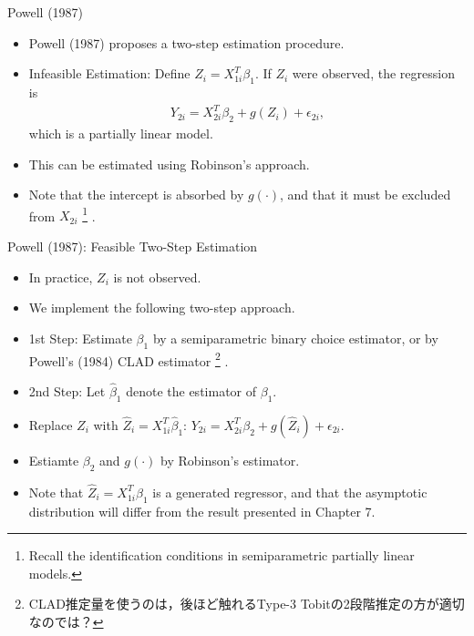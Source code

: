 \documentclass[xcolor=svgnames,dvipdfmx,cjk]{beamer}
\theoremstyle{example}
\begin{document}
\begin{frame}{Powell (1987)}
      \begin{itemize}
            \item Powell (1987) proposes a two-step estimation procedure.
            \item \alert{Infeasible Estimation}: Define $Z_i = X_{1i}^T \beta_1$. If $Z_i$ were observed, the regression is 
                  \begin{align*}
                        Y_{2i} = X_{2i}^T \beta_2 + g(Z_i) + \epsilon_{2i},
                  \end{align*}
                  which is a partially linear model. 
            \item This can be estimated using Robinson's approach.
            \item Note that the intercept is absorbed by $g(\cdot)$, 
                  and that it must be excluded from $X_{2i}$
                  \footnote{Recall the identification conditions in semiparametric partially linear models.}
                  .
      \end{itemize}
\end{frame}

\begin{frame}{Powell (1987): Feasible Two-Step Estimation}
      \begin{itemize}
            \item In practice, $Z_i$ is not observed. 
            \item We implement the following two-step approach.
            \item \alert{1st Step}: Estimate $\beta_1$ 
                  by a semiparametric binary choice estimator, 
                  or by Powell's (1984) CLAD estimator
                  \footnote{CLAD推定量を使うのは，後ほど触れるType-3 Tobitの2段階推定の方が適切なのでは？}
                  .
            \item \alert{2nd Step}: Let $\hat{\beta}_1$ denote the estimator of $\beta_1$.
            \item Replace $Z_i$ with $\hat{Z}_i = X_{1i}^T \hat{\beta}_1$: $ Y_{2i} = X_{2i}^T \beta_2 + g(\hat{Z}_i) + \epsilon_{2i}$.
            \item Estiamte $\beta_2$ and $g(\cdot)$ by Robinson's estimator.
            \item Note that $\hat{Z}_i = X_{1i}^T \hat{\beta}_1$ is a generated regressor, 
                  and that the asymptotic distribution will differ from the result presented in Chapter 7.
      \end{itemize}
\end{frame}
\end{document}
